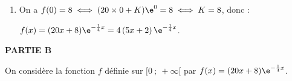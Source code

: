 \begin{enumerate}
$f'(x) + \dfrac14f(x) = 20\e^{- \frac14 x}$ ou d'après la question 1. :

$f'(x) + \dfrac14f(x) = g'(x) + \dfrac14g(x) \iff f'(x) - g'(x) = \dfrac14[f(x) - g(x)]$ soit par linéarité de la dérivation :

$(f - g)'(x) + \dfrac14[(f - g ](x) = 0$ : ceci signifie que la fonction $f - g$ est solution de $(E')$ c'est-à)dire que 

$f(x) - g(x) = K\e^{-\frac14 x} \iff f(x) = K\e^{-\frac14 x} + g(x)$ ou enfin 
$f(x) = K\e^{-\frac14 x} + 20x\e^{-\frac14 x}\iff f(x) = (20x + K)\e^{-\frac14 x}$, avec $K \in \R$.

Les solutions de $(E)$ sur l'intervalle $[0~;~ +\infty[$ sont donc les fonctions $f$ définies par:\\
$f(x) = \e^{-\frac14 x}(20x + K)$, avec  $K \in \R$.

\item 
On a $f(0) = 8 \iff (20 \times 0 + K)\e^{0} = 8 \iff K = 8$, donc :

$f(x) = (20x + 8)\e^{-\frac14 x} = 4\left (5x + 2\right )\e^{-\frac14 x}$.
\end{enumerate}

\bigskip

\textbf{PARTIE B}

\medskip

On considère la fonction $f$ définie sur $[0~;~ +\infty[$ par 
$f(x) = (20x + 8)\e^{-\frac14 x}$.





